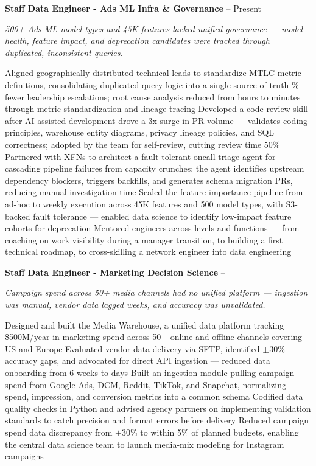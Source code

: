 \documentclass[letterpaper,MMMyyyy,nonstopmode]{simpleresumecv}
\begin{document}
\begin{Body}
\Gap

\begingroup
\textbf{Staff Data Engineer - Ads ML Infra \& Governance}
\hfill
{} -- Present

\Entry
\textit{500+ Ads ML model types and 45K features lacked unified governance --- model health, feature impact, and deprecation candidates were tracked through duplicated, inconsistent queries.}

\BulletItem Aligned geographically distributed technical leads to standardize MTLC metric definitions, consolidating duplicated query logic into a single source of truth
\% fewer leadership escalations; root cause analysis reduced from hours to minutes through metric standardization and lineage tracing
\BulletItem Developed a code review skill after AI-assisted development drove a 3x surge in PR volume --- validates coding principles, warehouse entity diagrams, privacy lineage policies, and SQL correctness; adopted by the team for self-review, cutting review time 50\%
\BulletItem Partnered with XFNs to architect a fault-tolerant oncall triage agent for cascading pipeline failures from capacity crunches; the agent identifies upstream dependency blockers, triggers backfills, and generates schema migration PRs, reducing manual investigation time
\BulletItem Scaled the feature importance pipeline from ad-hoc to weekly execution across 45K features and 500 model types, with S3-backed fault tolerance --- enabled data science to identify low-impact feature cohorts for deprecation
\BulletItem Mentored engineers across levels and functions --- from coaching on work visibility during a manager transition, to building a first technical roadmap, to cross-skilling a network engineer into data engineering
\endgroup

\BigGap

\begingroup
\textbf{Staff Data Engineer - Marketing Decision Science}
\hfill
{} -- 

\Entry
\textit{Campaign spend across 50+ media channels had no unified platform --- ingestion was manual, vendor data lagged weeks, and accuracy was unvalidated.}

\BulletItem Designed and built the Media Warehouse, a unified data platform tracking \$500M/year in marketing spend across 50+ online and offline channels covering US and Europe
\BulletItem Evaluated vendor data delivery via SFTP, identified $\pm$30\% accuracy gaps, and advocated for direct API ingestion --- reduced data onboarding from 6 weeks to days
\BulletItem Built an ingestion module pulling campaign spend from Google Ads, DCM, Reddit, TikTok, and Snapchat, normalizing spend, impression, and conversion metrics into a common schema
\BulletItem Codified data quality checks in Python and advised agency partners on implementing validation standards to catch precision and format errors before delivery
\BulletItem Reduced campaign spend data discrepancy from $\pm$30\% to within 5\% of planned budgets, enabling the central data science team to launch media-mix modeling for Instagram campaigns
\endgroup


\end{Body}
\end{document}
